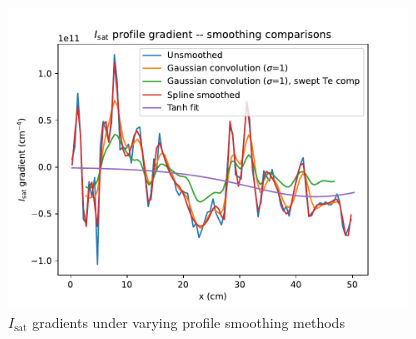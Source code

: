 \begin{figure}
    \centering
    \includegraphics[width=300pt]{figures/extra/isat_prof_gradient_smoothing.pdf}
    \caption[$I_\text{sat}$ gradients under varying profile smoothing methods]{$I_\text{sat}$ gradients under varying profile smoothing methods}
    \label{fig_extra:isat_prof_gradient_smoothing}
\end{figure}

